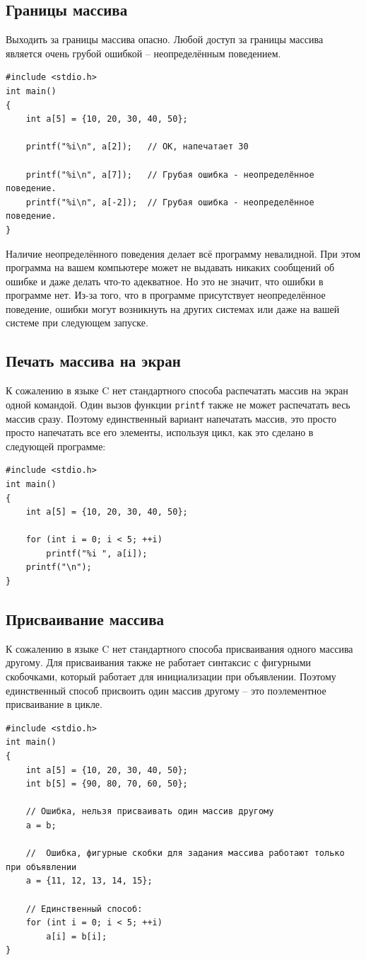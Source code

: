 \documentclass{article}
\begin{document}
\subsection*{Границы массива}
Выходить за границы массива опасно. Любой доступ за границы массива является очень грубой ошибкой -- неопределённым поведением.
\begin{lstlisting}
#include <stdio.h>
int main()
{
	int a[5] = {10, 20, 30, 40, 50};
	
	printf("%i\n", a[2]); 	// ОК, напечатает 30
	
	printf("%i\n", a[7]); 	// Грубая ошибка - неопределённое поведение.
	printf("%i\n", a[-2]); 	// Грубая ошибка - неопределённое поведение.
}
\end{lstlisting}
Наличие неопределённого поведения делает всё программу невалидной. При этом программа на вашем компьютере может не выдавать никаких сообщений об ошибке и даже делать что-то адекватное. Но это не значит, что ошибки в программе нет. Из-за того, что в программе присутствует неопределённое поведение, ошибки могут возникнуть на других системах или даже на вашей системе при следующем запуске. 

\subsection*{Печать массива на экран}
К сожалению в языке C нет стандартного способа распечатать массив на экран одной командой.
Один вызов функции \texttt{printf} также не может распечатать весь массив сразу.
Поэтому единственный вариант напечатать массив, это просто просто напечатать все его элементы, используя цикл, как это сделано в следующей программе:
\begin{lstlisting}
#include <stdio.h>
int main()
{
    int a[5] = {10, 20, 30, 40, 50};

    for (int i = 0; i < 5; ++i)
        printf("%i ", a[i]);
    printf("\n");
}
\end{lstlisting}

\subsection*{Присваивание массива}
К сожалению в языке C нет стандартного способа присваивания одного массива другому. Для присваивания также не работает синтаксис с фигурными скобочками, который работает для инициализации при объявлении. Поэтому единственный способ присвоить один массив другому -- это поэлементное присваивание в цикле.
\begin{lstlisting}
#include <stdio.h>
int main()
{
    int a[5] = {10, 20, 30, 40, 50};
    int b[5] = {90, 80, 70, 60, 50};

	// Ошибка, нельзя присваивать один массив другому
	a = b;	
	
	//	Ошибка, фигурные скобки для задания массива работают только при объявлении			
    a = {11, 12, 13, 14, 15};	
    
    // Единственный способ:
    for (int i = 0; i < 5; ++i)
    	a[i] = b[i];
}
\end{lstlisting}
\end{document}
